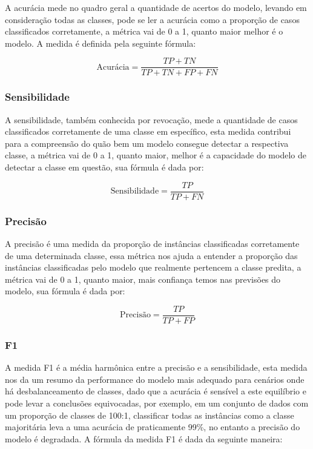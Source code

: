 A acurácia mede no quadro geral a quantidade de acertos do modelo, levando em consideração todas as classes, pode se ler a acurácia como a proporção de casos classificados corretamente, a métrica vai de 0 a 1, quanto maior melhor é o modelo. A medida é definida pela seguinte fórmula:

\begin{equation}
    \text{Acurácia} = \frac{TP + TN}{TP + TN + FP + FN}
\end{equation}

\subsubsection{Sensibilidade}

A sensibilidade, também conhecida por revocação, mede a quantidade de casos classificados corretamente de uma classe em específico, esta medida contribui para a compreensão do quão bem um modelo consegue detectar a respectiva classe, a métrica vai de 0 a 1, quanto maior, melhor é a capacidade do modelo de detectar a classe em questão, sua fórmula é dada por:

\begin{equation}
    \text{Sensibilidade} = \frac{TP}{TP + FN}
\end{equation}

\subsubsection{Precisão}

A precisão é uma medida da proporção de instâncias classificadas corretamente de uma determinada classe, essa métrica nos ajuda a entender a proporção das instâncias classificadas pelo modelo que realmente pertencem a classe predita, a métrica vai de 0 a 1, quanto maior, mais confiança temos nas previsões do modelo, sua fórmula é dada por:

\begin{equation}
    \text{Precisão} = \frac{TP}{TP+FP}
\end{equation}

\subsubsection{F1}

A medida F1 é a média harmônica entre a precisão e a sensibilidade, esta medida nos da um resumo da performance do modelo mais adequado para cenários onde há desbalanceamento de classes, dado que a acurácia é sensível a este equilíbrio e pode levar a conclusões equivocadas, por exemplo, em um conjunto de dados com um proporção de classes de 100:1, classificar todas as instâncias como a classe majoritária leva a uma acurácia de praticamente 99\%, no entanto a precisão do modelo é degradada. A fórmula da medida F1 é dada da seguinte maneira:

